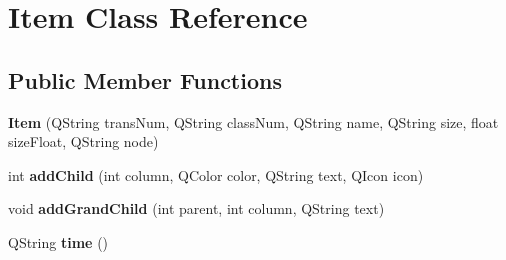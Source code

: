\hypertarget{class_item}{}\section{Item Class Reference}
\label{class_item}
\subsection*{Public Member Functions}
\begin{DoxyCompactItemize}
\item 
{\bfseries Item} (Q\+String trans\+Num, Q\+String class\+Num, Q\+String name, Q\+String size, float size\+Float, Q\+String node)\hypertarget{class_item_a114c7c3f92e1a1fc0e47bc02220a85cf}{}\label{class_item_a114c7c3f92e1a1fc0e47bc02220a85cf}

\item 
int {\bfseries add\+Child} (int column, Q\+Color color, Q\+String text, Q\+Icon icon)\hypertarget{class_item_a1141921aa77d1b1a314b892aeeda89dd}{}\label{class_item_a1141921aa77d1b1a314b892aeeda89dd}

\item 
void {\bfseries add\+Grand\+Child} (int parent, int column, Q\+String text)\hypertarget{class_item_aef32096d890554c8630818ad5a7a05d8}{}\label{class_item_aef32096d890554c8630818ad5a7a05d8}

\item 
Q\+String {\bfseries time} ()\hypertarget{class_item_a488a39cca0c2600cc0f99dbf0a42de32}{}\label{class_item_a488a39cca0c2600cc0f99dbf0a42de32}

\end{DoxyCompactItemize}
